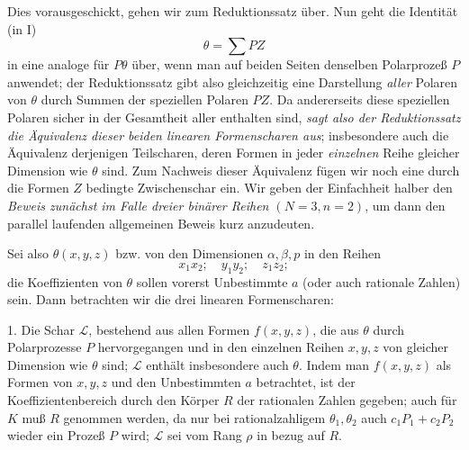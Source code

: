 Dies vorausgeschickt, gehen wir zum Reduktionssatz über. Nun geht die Identität (in I)
\[
  \theta=\sum PZ
\]
in eine analoge für $P\theta$ über, wenn man auf beiden Seiten denselben Polarprozeß $P$ anwendet; der Reduktionssatz gibt also gleichzeitig eine Darstellung \emph{aller} Polaren von $\theta$ durch Summen der speziellen Polaren $PZ$. Da andererseits diese speziellen Polaren sicher in der Gesamtheit aller enthalten sind, \emph{sagt also der Reduktionssatz die Äquivalenz dieser beiden linearen Formenscharen aus}; insbesondere auch die Äquivalenz derjenigen Teilscharen, deren Formen in jeder \emph{einzelnen} Reihe gleicher Dimension wie $\theta$ sind. Zum Nachweis dieser Äquivalenz fügen wir noch eine durch die Formen $Z$ bedingte Zwischenschar ein. Wir geben der Einfachheit halber den \emph{Beweis zunächst im Falle dreier binärer Reihen $(N=3,n=2)$}, um dann den parallel laufenden allgemeinen Beweis kurz anzudeuten.

Sei also $\theta(x,y,z)$ bzw. von den Dimensionen $\alpha,\beta,p$ in den Reihen
\[
  x_1x_2;\quad y_1y_2;\quad z_1z_2;
\]
die Koeffizienten von $\theta$ sollen vorerst Unbestimmte $a$ (oder auch rationale Zahlen) sein. Dann betrachten wir die drei linearen Formenscharen:

1. Die Schar $\mathcal L$, bestehend aus allen Formen $f(x,y,z)$, die aus $\theta$ durch Polarprozesse $P$ hervorgegangen und in den einzelnen Reihen $x,y,z$ von gleicher Dimension wie $\theta$ sind; $\mathcal L$ enthält insbesondere auch $\theta$. Indem man $f(x,y,z)$ als Formen von $x,y,z$ und den Unbestimmten $a$ betrachtet, ist der Koeffizientenbereich durch den Körper $R$ der rationalen Zahlen gegeben; auch für $K$ muß $R$ genommen werden, da nur bei rationalzahligem $\theta_1,\theta_2$ auch $c_1P_1+c_2P_2$ wieder ein Prozeß $P$ wird; $\mathcal L$ sei vom Rang $\rho$ in bezug auf $R$.

